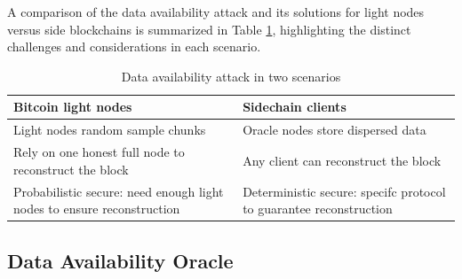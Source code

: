 \documentclass{report}
\begin{document}
A comparison of the data availability attack and its solutions for light nodes versus side blockchains is summarized in Table \ref{table:t1}, highlighting the distinct challenges and considerations in each scenario.
\begin{table}[htbp]
	\centering
	\captionsetup{justification=centering}
	\caption[position=above]{Data availability attack in two scenarios}
	\begin{tabular}{|>{\centering\arraybackslash}p{8cm}|>{\centering\arraybackslash}p{8cm}|}
		\hline
		Bitcoin light nodes & Sidechain clients\\
		\hline
		Light nodes random sample chunks & Oracle nodes store dispersed data \\
		\hline
		Rely on one honest full node to	reconstruct the block & Any client can reconstruct the block \\
		\hline
		Probabilistic secure: need enough light nodes to ensure reconstruction & Deterministic secure: specifc protocol to guarantee reconstruction \\
		\hline
	\end{tabular}
	\label{table:t1}
\end{table}
\subsection{Data Availability Oracle}
\end{document}
